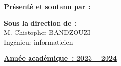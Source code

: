 \begin{titlepage}
  \vspace{2.0cm}

  \noindent
  \begin{minipage}[t]{0.45\textwidth}
    \large{
      \textbf{
        Présenté et soutenu par : \\
      }
    }
    \normalsize{
      \projetauthor
    }

  \end{minipage}
  \hfill
  \begin{minipage}[t]{0.45\textwidth}
    \raggedleft
    \large{
      \textbf{
        Sous la direction de : \\
      }
      M. Chistopher BANDZOUZI \\
      Ingénieur informaticien
    }
  \end{minipage}

  \vspace{3.9cm}
  \begin{center}
    \large {
      \textbf { \underline {Année académique : 2023 – 2024} }
    }

  \end{center}


\end{titlepage}
